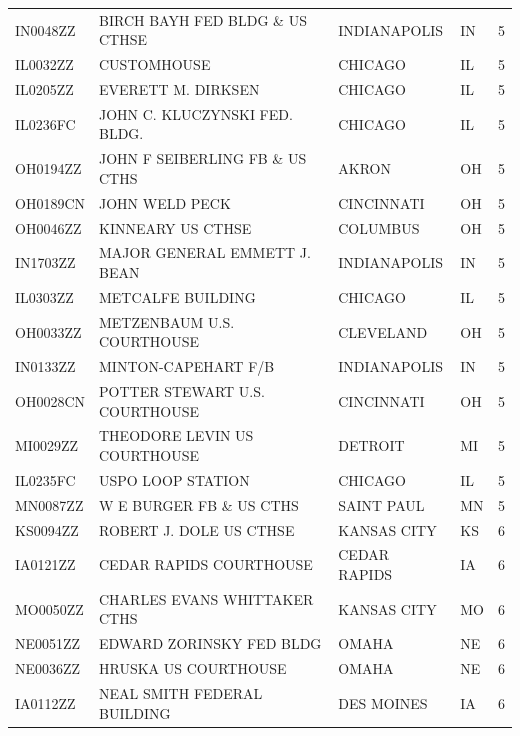 \documentclass[12pt]{article}
\begin{document}
{\begin{longtable}{lllll}
IN0048ZZ         & BIRCH BAYH FED BLDG \& US CTHSE & INDIANAPOLIS   & IN    & 5      \\
IL0032ZZ         & CUSTOMHOUSE                     & CHICAGO        & IL    & 5      \\
IL0205ZZ         & EVERETT M. DIRKSEN              & CHICAGO        & IL    & 5      \\
IL0236FC         & JOHN C. KLUCZYNSKI FED. BLDG.   & CHICAGO        & IL    & 5      \\
OH0194ZZ         & JOHN F SEIBERLING FB \& US CTHS & AKRON          & OH    & 5      \\
OH0189CN         & JOHN WELD PECK                  & CINCINNATI     & OH    & 5      \\
OH0046ZZ         & KINNEARY US CTHSE               & COLUMBUS       & OH    & 5      \\
IN1703ZZ         & MAJOR GENERAL EMMETT J. BEAN    & INDIANAPOLIS   & IN    & 5      \\
IL0303ZZ         & METCALFE BUILDING               & CHICAGO        & IL    & 5      \\
OH0033ZZ         & METZENBAUM U.S. COURTHOUSE      & CLEVELAND      & OH    & 5      \\
IN0133ZZ         & MINTON-CAPEHART F/B             & INDIANAPOLIS   & IN    & 5      \\
OH0028CN         & POTTER STEWART U.S. COURTHOUSE  & CINCINNATI     & OH    & 5      \\
MI0029ZZ         & THEODORE LEVIN US COURTHOUSE    & DETROIT        & MI    & 5      \\
IL0235FC         & USPO LOOP STATION               & CHICAGO        & IL    & 5      \\
MN0087ZZ         & W E BURGER FB \& US CTHS        & SAINT PAUL     & MN    & 5      \\
KS0094ZZ         & ROBERT J. DOLE US CTHSE         & KANSAS CITY    & KS    & 6      \\
IA0121ZZ         & CEDAR RAPIDS COURTHOUSE         & CEDAR RAPIDS   & IA    & 6      \\
MO0050ZZ         & CHARLES EVANS WHITTAKER CTHS    & KANSAS CITY    & MO    & 6      \\
NE0051ZZ         & EDWARD ZORINSKY FED BLDG        & OMAHA          & NE    & 6      \\
NE0036ZZ         & HRUSKA US COURTHOUSE            & OMAHA          & NE    & 6      \\
IA0112ZZ         & NEAL SMITH FEDERAL BUILDING     & DES MOINES     & IA    & 6      \\

\end{longtable}}
\end{document}
